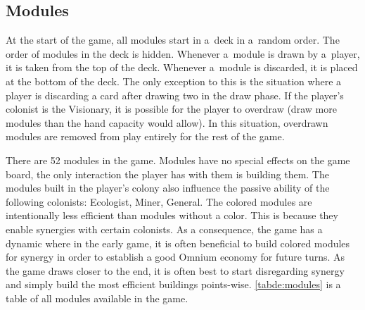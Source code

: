 \clearpage
\subsection{Modules}
\label{de:modules}

At the start of the game, all modules start in a~deck in a~random order.
The order of modules in the deck is hidden. Whenever a~module is drawn by
a~player, it is taken from the top of the deck. Whenever a~module is discarded, it
is placed at the bottom of the deck. The only exception to this is the situation where
a player is discarding a card after drawing two in the draw phase. If the player's
colonist is the Visionary, it is possible for the player to overdraw (draw more modules
than the hand capacity would allow). In this situation, overdrawn modules are removed
from play entirely for the rest of the game.

There are 52 modules in the game. Modules have no special effects on the game board,
the only interaction the player has with them is building them.
The modules built in the player's colony also influence the passive ability
of the following colonists: Ecologist, Miner, General. The colored modules
are intentionally less efficient than modules without a color. This is because
they enable synergies with certain colonists. As a consequence, the game has a dynamic
where in the early game, it is often beneficial to build colored modules for synergy
in order to establish a good Omnium economy for future turns. As the game draws closer
to the end, it is often best to start disregarding synergy and simply build the most
efficient buildings points-wise.
\autoref{tabde:modules} is a table of all modules available in the game.

